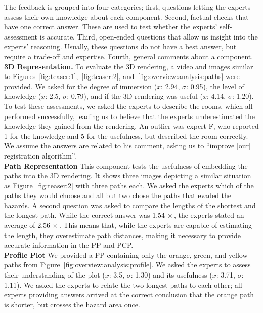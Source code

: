 \documentclass{egpubl}
\begin{document}
The feedback is grouped into four categories; first, questions letting the experts assess their own knowledge about each component. Second, factual checks that have one correct answer. These are used to test whether the experts' self-assessment is accurate. Third, open-ended questions that allow us insight into the experts' reasoning. Usually, these questions do not have a best answer, but require a trade-off and expertise. Fourth, general comments about a component.\\
%
\noindent \textbf{3D Representation.} To evaluate the 3D rendering, a video and images similar to Figures~\ref{fig:teaser:1},~\ref{fig:teaser:2}, and~\ref{fig:overview:analysis:paths} were provided. We asked for the degree of immersion ($\bar{x}$: 2.94, $\sigma$: 0.95), the level of knowledge ($\bar{x}$: 2.5, $\sigma$: 0.79), and if the 3D rendering was useful ($\bar{x}$: 4.14, $\sigma$: 1.20). To test these assessments, we asked the experts to describe the rooms, which all performed successfully, leading us to believe that the experts underestimated the knowledge they gained from the rendering. An outlier was expert F, who reported 1 for the knowledge and 5 for the usefulness, but described the room correctly. We assume the answers are related to his comment, asking us to ``improve [our] registration algorithm''. \\
%
\textbf{Path Representation} This component tests the usefulness of embedding the paths into the 3D rendering. It shows three images depicting a similar situation as Figure~\ref{fig:teaser:2} with three paths each. We asked the experts which of the paths they would choose and all but two chose the paths that evaded the hazards. A second question was asked to compare the lengths of the shortest and the longest path. While the correct answer was 1.54$\,\times$, the experts stated an average of 2.56$\,\times$. This means that, while the experts are capable of estimating the length, they overestimate path distances, making it necessary to provide accurate information in the PP and PCP.\\
%
%
\textbf{Profile Plot} We provided a PP containing only the orange, green, and yellow paths from Figure~\ref{fig:overview:analysis:profile}. We asked the experts to assess their understanding of the plot ($\bar{x}$: 3.5, $\sigma$: 1.30) and its usefulness ($\bar{x}$: 3.71, $\sigma$: 1.11). We asked the experts to relate the two longest paths to each other; all experts providing answers arrived at the correct conclusion that the orange path is shorter, but crosses the hazard area once. \\
\end{document}

